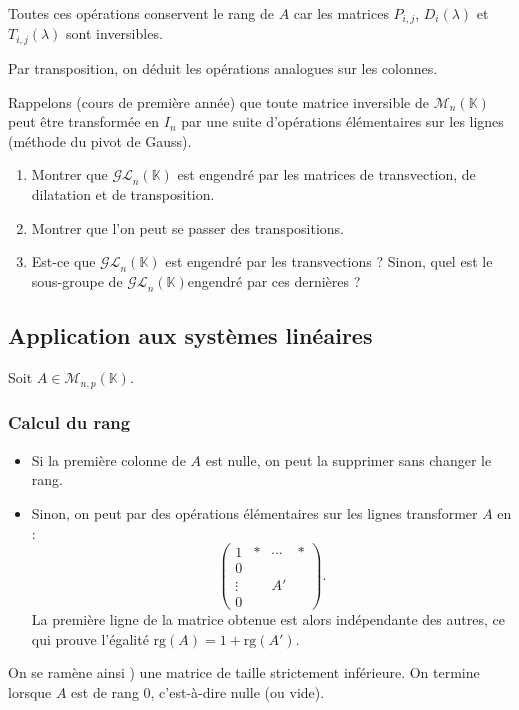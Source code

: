 \documentclass[french]{article}
\newcommand{\K}{\mathbb{K}}
\newcommand{\rg}{\text{rg}}
\theoremstyle{plain}
\theoremstyle{definition}
\theoremstyle{remark}
\begin{document}
Toutes ces opérations conservent le rang de $A$ car les matrices $P_{i,j}$, $D_i(\lambda)$ et $T_{i,j}(\lambda)$ sont inversibles.

Par transposition, on déduit les opérations analogues sur les colonnes.

Rappelons (cours de première année) que toute matrice inversible de $\mathcal{M}_n(\K)$ peut être transformée en $I_n$ par une suite d'opérations élémentaires sur les lignes (méthode du pivot de Gauss).

\begin{exo}
	\begin{enumerate}
		\item Montrer que $\mathcal{GL}_n(\K)$ est engendré par les matrices de transvection, de dilatation et de transposition.
		\item Montrer que l'on peut se passer des transpositions.
		\item Est-ce que $\mathcal{GL}_n(\K)$ est engendré par les transvections ? Sinon, quel est le sous-groupe de $\mathcal{GL}_n(\K)$engendré par ces dernières ?
	\end{enumerate}
\end{exo}

\subsection{Application aux systèmes linéaires}

Soit $A\in\mathcal{M}_{n,p}(\K)$.

\subsubsection*{Calcul du rang}

\begin{itemize}
	\item Si la première colonne de $A$ est nulle, on peut la supprimer sans changer le rang.
	\item Sinon, on peut par des opérations élémentaires sur les lignes transformer $A$ en :
	$$\begin{pmatrix}
		1&*&\cdots&*\\
		0&&&\\
		\vdots&&A'&\\
		0&&&
	\end{pmatrix}.$$
	La première ligne de la matrice obtenue est alors indépendante des autres, ce qui prouve l'égalité $\rg(A)=1+\rg(A')$.
\end{itemize}
On se ramène ainsi ) une matrice de taille strictement inférieure. On termine lorsque $A$ est de rang $0$, c'est-à-dire nulle (ou vide).
\end{document}

